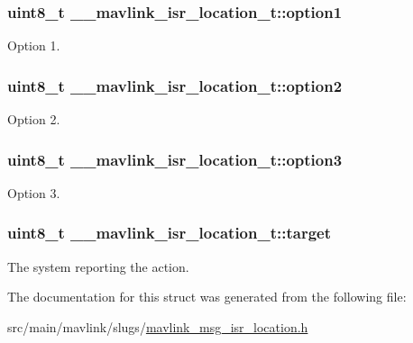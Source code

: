 \hypertarget{struct____mavlink__isr__location__t_a89a81bb67aec9c999a150b2b45dd9090}{
\subsubsection[{option1}]{\setlength{\rightskip}{0pt plus 5cm}uint8\+\_\+t \+\_\+\+\_\+mavlink\+\_\+isr\+\_\+location\+\_\+t\+::option1}}\label{struct____mavlink__isr__location__t_a89a81bb67aec9c999a150b2b45dd9090}


Option 1. 

\hypertarget{struct____mavlink__isr__location__t_abd0a0be1e0f63d9a08f02df446f726dc}{
\subsubsection[{option2}]{\setlength{\rightskip}{0pt plus 5cm}uint8\+\_\+t \+\_\+\+\_\+mavlink\+\_\+isr\+\_\+location\+\_\+t\+::option2}}\label{struct____mavlink__isr__location__t_abd0a0be1e0f63d9a08f02df446f726dc}


Option 2. 

\hypertarget{struct____mavlink__isr__location__t_ac4ad50b049db3a39b9902147efe67d78}{
\subsubsection[{option3}]{\setlength{\rightskip}{0pt plus 5cm}uint8\+\_\+t \+\_\+\+\_\+mavlink\+\_\+isr\+\_\+location\+\_\+t\+::option3}}\label{struct____mavlink__isr__location__t_ac4ad50b049db3a39b9902147efe67d78}


Option 3. 

\hypertarget{struct____mavlink__isr__location__t_a497d9090eb860ec7b2e1871f0e452a77}{
\subsubsection[{target}]{\setlength{\rightskip}{0pt plus 5cm}uint8\+\_\+t \+\_\+\+\_\+mavlink\+\_\+isr\+\_\+location\+\_\+t\+::target}}\label{struct____mavlink__isr__location__t_a497d9090eb860ec7b2e1871f0e452a77}


The system reporting the action. 



The documentation for this struct was generated from the following file\+:\begin{DoxyCompactItemize}
\item 
src/main/mavlink/slugs/\hyperlink{mavlink__msg__isr__location_8h}{mavlink\+\_\+msg\+\_\+isr\+\_\+location.\+h}\end{DoxyCompactItemize}
